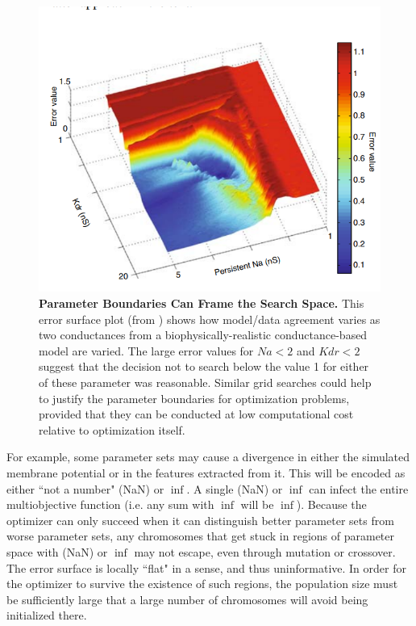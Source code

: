 \begin{figure}
    \centering
    \includegraphics[scale=0.65]{figures/cliff.png}
    \caption[A Plot of a Cliff Ledge Framing a 2D Error Surface]{\textbf{Parameter Boundaries Can Frame the Search Space.}
    This error surface plot (from \cite{van2007neurofitter,van2008automated})
    shows how model/data agreement varies as two conductances from a biophysically-realistic conductance-based model are varied.
    The large error values for $Na<2$ and $Kdr<2$ suggest that the decision not to search below the value 1 for either of these parameter was reasonable.
    Similar grid searches could help to justify the parameter boundaries for optimization problems, provided that they can be conducted at low computational cost relative to optimization itself.}
    \label{fig:best_at_edge_1}
\end{figure}

For example, some parameter sets may cause a divergence in either the simulated membrane potential or in the features extracted from it.
This will be encoded as either ``not a number" (NaN) or $\inf$.
A single (NaN) or $\inf$ can infect the entire multiobjective function (i.e. any sum with $\inf$ will be $\inf$).
Because the optimizer can only succeed when it can distinguish better parameter sets from worse parameter sets, any chromosomes that get stuck in regions of parameter space with (NaN) or $\inf$ may not escape, even through mutation or crossover.
The error surface is locally ``flat" in a sense, and thus uninformative.
In order for the optimizer to survive the existence of such regions, the population size must be sufficiently large that a large number of chromosomes will avoid being initialized there.

